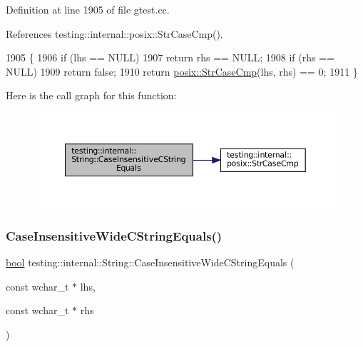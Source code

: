 Definition at line 1905 of file gtest.\+cc.



References testing\+::internal\+::posix\+::\+Str\+Case\+Cmp().


\begin{DoxyCode}
1905                                                                             \{
1906   \textcolor{keywordflow}{if} (lhs == NULL)
1907     \textcolor{keywordflow}{return} rhs == NULL;
1908   \textcolor{keywordflow}{if} (rhs == NULL)
1909     \textcolor{keywordflow}{return} \textcolor{keyword}{false};
1910   \textcolor{keywordflow}{return} \hyperlink{namespacetesting_1_1internal_1_1posix_a1ef2385a7f8e4c706054da35967e76bd}{posix::StrCaseCmp}(lhs, rhs) == 0;
1911 \}
\end{DoxyCode}
Here is the call graph for this function\+:
\nopagebreak
\begin{figure}[H]
\begin{center}
\leavevmode
\includegraphics[width=350pt]{classtesting_1_1internal_1_1String_a116ca435d63306927ba19f90a3596787_cgraph}
\end{center}
\end{figure}
\mbox{\label{classtesting_1_1internal_1_1String_a1f12d1780ca7afbf8975f5d425b9f362}} 
\subsubsection{\texorpdfstring{Case\+Insensitive\+Wide\+C\+String\+Equals()}{CaseInsensitiveWideCStringEquals()}}
{\footnotesize\ttfamily \hyperlink{classbool}{bool} testing\+::internal\+::\+String\+::\+Case\+Insensitive\+Wide\+C\+String\+Equals (\begin{DoxyParamCaption}\item[{const wchar\+\_\+t $\ast$}]{lhs,  }\item[{const wchar\+\_\+t $\ast$}]{rhs }\end{DoxyParamCaption})\hspace{0.3cm}{\ttfamily [static]}}



